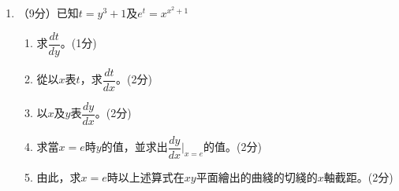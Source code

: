\documentclass[12pt]{article}
\begin{document}
    \begin{enumerate}
        \item （9分）已知$t=y^3+1$及$e^t=x^{x^2+1}$\begin{enumerate}
            \item 求$\dfrac{dt}{dy}$。\hfill(1分)
            \item 從以$x$表$t$，求$\dfrac{dt}{dx}$。\hfill(2分)
            \item 以$x$及$y$表$\dfrac{dy}{dx}$。\hfill(2分)
            \item 求當$x=e$時$y$的值，並求出$\dfrac{dy}{dx}\bigg|_{x=e}$的值。\hfill(2分)
            \item 由此，求$x=e$時以上述算式在$xy$平面繪出的曲綫的切綫的$x$軸截距。\hfill(2分)
        \end{enumerate}

        \hrulefill

        \hrulefill

        \hrulefill

        \hrulefill

        \hrulefill

        \hrulefill

        \hrulefill

        \hrulefill

        \hrulefill

        \hrulefill

        \hrulefill

        \hrulefill

        \hrulefill

        \hrulefill

        \hrulefill

        \hrulefill

        \hrulefill

        \hrulefill

        \hrulefill

        \hrulefill

        \hrulefill

        \hrulefill

        \hrulefill

        \hrulefill

        \hrulefill

        \hrulefill

        \hrulefill

        \hrulefill

        \hrulefill


\end{enumerate}
\end{document}
